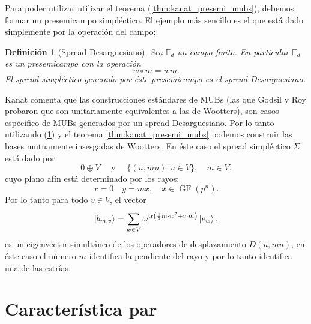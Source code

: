 \documentclass[a4paper]{report}
\DeclareMathOperator{\tr}{tr}
\DeclareMathOperator{\GF}{GF}
\newtheorem{definition}{Definición}
\begin{document}
  Para poder utilizar utilizar el teorema
  (\ref{thm:kanat_presemi_mubs}), debemos formar un
  presemicampo simpléctico. El ejemplo más sencillo es el
  que está dado simplemente por la operación del campo:
  \begin{definition}[Spread Desarguesiano]
    \label{def:desarguesian_semifield}
    Sea $\mathbb F_d$ un campo finito. En particular
    $\mathbb F_d$ es un presemicampo con la operación
    \begin{equation}
      w \circ m = w m.
    \end{equation}
    El spread simpléctico generado por éste presemicampo es
    el spread Desarguesiano.
  \end{definition}
  Kanat comenta que las construcciones estándares de MUBs
  (las que Godsil y Roy probaron que son unitariamente
  equivalentes a las de Wootters), son casos específico de 
  MUBs generados por un spread Desarguesiano. Por lo tanto
  utilizando (\ref{def:desarguesian_semifield}) y el teorema
  \ref{thm:kanat_presemi_mubs} podemos construir las bases
  mutuamente insesgadas de Wootters. En éste caso el spread
  simpléctico $\Sigma$ está dado por
  \begin{equation}
    0 \oplus V
    \quad \text{ y } \quad
    \{(u,mu) : u \in V\},
    \quad m \in V.
  \end{equation}
  cuyo plano afín está determinado por los rayos:
  \begin{equation}
    x = 0
    \quad
    y = mx,
    \quad
    x \in \GF(p^{n}).
  \end{equation}
  Por lo tanto para todo $v \in V$, el vector
  \[
    \ket{b_{m,v}}
    = \sum_{w \in V}^{} \omega^{\tr\left( \frac{1}{2} m
        \cdot w^2
    + v \cdot m\right) } \ket{e_w},
  \] 
  es un eigenvector simultáneo de los
  operadores de desplazamiento $D(u,mu)$, en éste caso el
  número $m$ identifica la pendiente del rayo y por lo tanto
  identifica una de las estrías.

  \section{Característica par}
\end{document}
